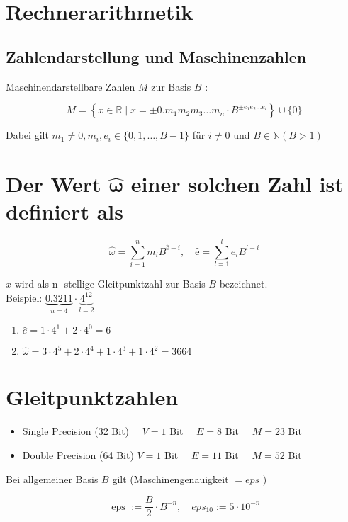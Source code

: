 \section{Rechnerarithmetik}

\subsection{Zahlendarstellung und Maschinenzahlen}

Maschinendarstellbare Zahlen $M$ zur Basis $B$ :

$$
M=\left\{x \in \mathbb{R} \mid x= \pm 0 . m_{1} m_{2} m_{3} \ldots m_{n} \cdot B^{ \pm e_{1} e_{2} \ldots e_{l}}\right\} \cup\{0\}
$$

Dabei gilt $m_{1} \neq 0, m_{i}, e_{i} \in\{0,1, \ldots, B-1\}$ für $i \neq 0$ und $B \in \mathbb{N}(B>1)$

\section*{Der Wert $\widehat{\boldsymbol{\omega}}$ einer solchen Zahl ist definiert als}
$$
\widehat{\omega}=\sum_{i=1}^{n} m_{i} B^{\hat{\mathrm{e}}-i}, \quad \hat{\mathrm{e}}=\sum_{l=1}^{l} e_{i} B^{l-i}
$$

$x$ wird als n -stellige Gleitpunktzahl zur Basis $B$ bezeichnet.\\
Beispiel: $\underbrace{0.3211}_{n=4} \cdot \underbrace{4^{12}}_{l=2}$

\begin{enumerate}
  \item $\hat{e}=1 \cdot 4^{1}+2 \cdot 4^{0}=6$
  \item $\widehat{\omega}=3 \cdot 4^{5}+2 \cdot 4^{4}+1 \cdot 4^{3}+1 \cdot 4^{2}=3664$
\end{enumerate}

\section*{Gleitpunktzahlen}
\begin{itemize}
  \item Single Precision (32 Bit) $\quad V=1$ Bit $\quad E=8$ Bit $\quad M=23$ Bit
  \item Double Precision (64 Bit) $V=1$ Bit $\quad E=11$ Bit $\quad M=52$ Bit
\end{itemize}

Bei allgemeiner Basis $B$ gilt (Maschinengenauigkeit $=e p s$ )

$$
\text { eps }:=\frac{B}{2} \cdot B^{-n}, \quad e p s_{10}:=5 \cdot 10^{-n}
$$

